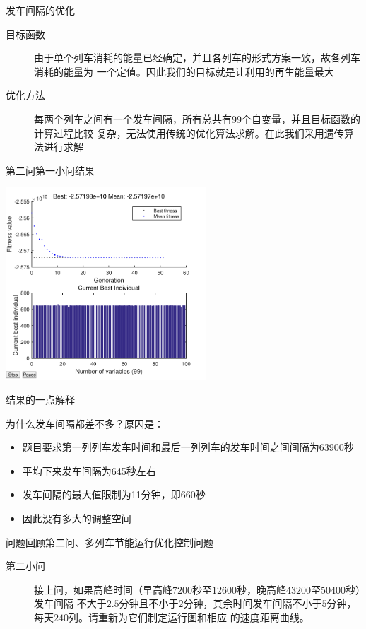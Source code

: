 \documentclass{beamer}
\begin{document}
\begin{frame}{发车间隔的优化}

\begin{description}
    \item[目标函数] 由于单个列车消耗的能量已经确定，并且各列车的形式方案一致，故各列车消耗的能量为
    一个定值。因此我们的目标就是让利用的再生能量最大
    \item[优化方法] 每两个列车之间有一个发车间隔，所有总共有99个自变量，并且目标函数的计算过程比较
    复杂，无法使用传统的优化算法求解。在此我们采用遗传算法进行求解
\end{description}

\end{frame}

\begin{frame}{第二问第一小问结果}
\begin{center}
\includegraphics[width=7.5cm]{fig/fig13/fig13.pdf}
\end{center}
\end{frame}

\begin{frame}{结果的一点解释}

为什么发车间隔都差不多？原因是：
\begin{itemize}
    \item 题目要求第一列列车发车时间和最后一列列车的发车时间之间间隔为63900秒
    \item 平均下来发车间隔为645秒左右
    \item 发车间隔的最大值限制为11分钟，即660秒
    \item 因此没有多大的调整空间
\end{itemize}

\end{frame}

\begin{frame}{问题回顾}{第二问、多列车节能运行优化控制问题}
\begin{description}
  \item[第二小问] 接上问，如果高峰时间（早高峰$7200$秒至$12600$秒，晚高峰$43200$至$50400$秒）发车间隔
  不大于$2.5$分钟且不小于$2$分钟，其余时间发车间隔不小于$5$分钟，每天$240$列。请重新为它们制定运行图和相应
  的速度距离曲线。
\end{description}
\end{frame}
\end{document}
